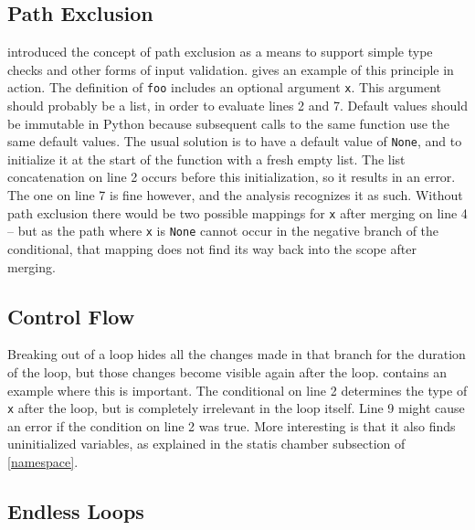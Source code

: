 \documentclass[a4paper, 16pt, oneside]{Thesis}
\begin{document}
\subsection{Path Exclusion}\label{path-exclusion}



 introduced the concept of path exclusion as a means
to support simple type checks and other forms of input validation.
 gives an example of this principle in action.
The definition of \texttt{foo} includes an optional argument \texttt{x}.
This argument should probably be a list, in order to evaluate lines 2
and 7. Default values should be immutable in Python because subsequent
calls to the same function use the same default values. The usual
solution is to have a default value of \texttt{None}, and to initialize
it at the start of the function with a fresh empty list. The list
concatenation on line 2 occurs before this initialization, so it results
in an error. The one on line 7 is fine however, and the analysis
recognizes it as such. Without path exclusion there would be two
possible mappings for \texttt{x} after merging on line 4 -- but as the
path where \texttt{x} is \texttt{None} cannot occur in the negative
branch of the conditional, that mapping does not find its way back into
the scope after merging.

\subsection{Control Flow}\label{control-flow}



Breaking out of a loop hides all the changes made in that branch for the
duration of the loop, but those changes become visible again after the
loop.  contains an example where this is important. The
conditional on line 2 determines the type of \texttt{x} after the loop,
but is completely irrelevant in the loop itself. Line 9 might cause an
error if the condition on line 2 was true. More interesting is that it
also finds uninitialized variables, as explained in the statis chamber
subsection of \cref{namespace}.

\subsection{Endless Loops}\label{endless-loops}


\end{document}
